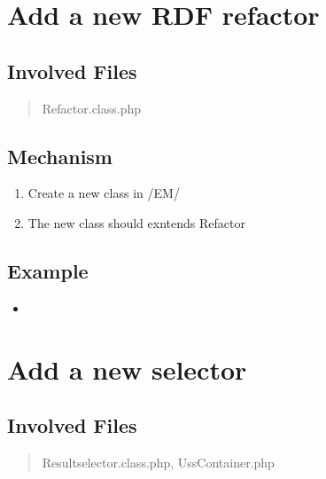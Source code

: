\documentclass[letterpaper,10pt,english]{sphinxmanual}
\begin{document}
\section{Add a new RDF refactor}
\label{docs/hooks/new_refactor:hook-refactor}\label{docs/hooks/new_refactor:add-a-new-rdf-refactor}\label{docs/hooks/new_refactor::doc}

\subsection{Involved Files}
\label{docs/hooks/new_refactor:involved-files}\begin{quote}

Refactor.class.php
\end{quote}


\subsection{Mechanism}
\label{docs/hooks/new_refactor:mechanism}\begin{enumerate}
\item {} 
Create a new class in /EM/

\item {} 
The new class should exntends Refactor

\end{enumerate}


\subsection{Example}
\label{docs/hooks/new_refactor:example}\begin{itemize}
\item {} 
{\hyperref[docs/api:ReplaceUri]{}}

\end{itemize}


\section{Add a new selector}
\label{docs/hooks/new_selector:hook-selector}\label{docs/hooks/new_selector::doc}\label{docs/hooks/new_selector:add-a-new-selector}

\subsection{Involved Files}
\label{docs/hooks/new_selector:involved-files}\begin{quote}

Resultselector.class.php, UssContainer.php
\end{quote}
\end{document}
